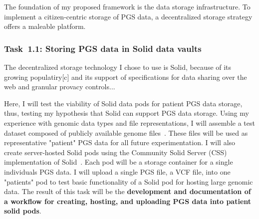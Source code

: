 \documentclass[a4paper,11pt]{article}
\begin{document}
\begin{refsection}
The foundation of my proposed framework is the data storage infrastructure.
To implement a citizen-centric storage of PGS data, a decentralized storage strategy offers a maleable platform.

\newcommand\WPaa{Storing PGS data in Solid data vaults}
\subsubsection{Task~1.1: \WPaa}

The decentralized storage technology I chose to use is Solid, because of its growing populatiry[c] and its support of specifications for data sharing over the web and granular provacy controls... %

Here, I will test the viability of Solid data pods for patient PGS data storage, thus, testing my hypothesis that Solid can support PGS data storage. 
Using my experience with genomic data types and file representations, I will assemble a test dataset composed of publicly available genome files~\cite{noauthor_platinum_nodate}. 
These files will be used as representative "patient" PGS data for all future experimentation. 
I will also create server-hosted Solid pods using the Community Solid Server (CSS) implementation of Solid~\cite{css}. 
Each pod will be a storage container for a single individual\textquotesingle s PGS data. 
I will upload a single PGS file, a VCF file, into one "patient\textquotesingle s" pod to test basic functionality of a Solid pod for hosting large genomic data. 
The result of this task will be the \textbf{development and documentation of a workflow for creating, hosting, and uploading PGS data into patient solid pods}.




\end{refsection}
\end{document}
